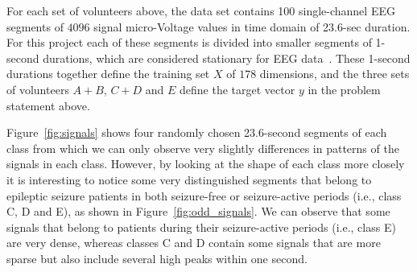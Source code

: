 \documentclass[12pt]{article}
\begin{document}
For each set of volunteers above, the data set contains 100 single-channel EEG segments of $4096$ signal micro-Voltage values in time domain of 23.6-sec duration. For this project each of these segments is divided into smaller segments of 1-second durations, which are considered stationary for EEG data~\cite{nigam2004neural}. These 1-second durations together define the training set $X$ of $178$ dimensions, and the three sets of volunteers $A + B$, $C + D$ and $E$ define the target vector $y$ in the problem statement above.

Figure~\ref{fig:signals} shows four randomly chosen 23.6-second segments of each class from which we can only observe very slightly differences in patterns of the signals in each class. However, by looking at the shape of each class more closely it is interesting to notice some very distinguished segments that belong to epileptic seizure patients in both seizure-free or seizure-active periods (i.e., class C, D and E), as shown in Figure~\ref{fig:odd_signals}. We can observe that some signals that belong to patients during their seizure-active periods (i.e., class E) are very dense, whereas classes C and D contain some signals that are more sparse but also include several high peaks within one second.
\end{document}
